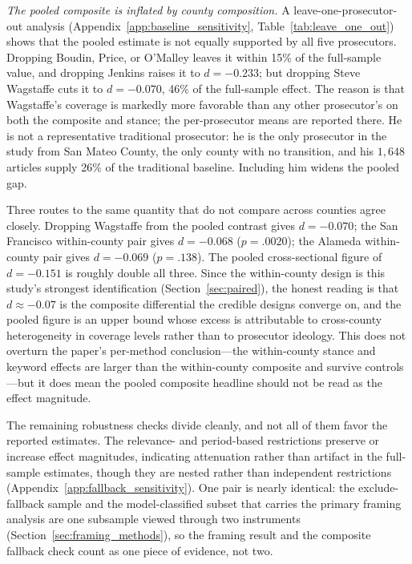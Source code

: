 \documentclass[12pt, letterpaper]{article}
\begin{document}
\emph{The pooled composite is inflated by county composition.} A leave-one-prosecutor-out analysis (Appendix~\ref{app:baseline_sensitivity}, Table~\ref{tab:leave_one_out}) shows that the pooled estimate is not equally supported by all five prosecutors. Dropping Boudin, Price, or O'Malley leaves it within 15\% of the full-sample value, and dropping Jenkins raises it to $d = -0.233$; but dropping Steve Wagstaffe cuts it to $d = -0.070$, 46\% of the full-sample effect. The reason is that Wagstaffe's coverage is markedly more favorable than any other prosecutor's on both the composite and stance; the per-prosecutor means are reported there. He is not a representative traditional prosecutor: he is the only prosecutor in the study from San Mateo County, the only county with no transition, and his $1{,}648$ articles supply 26\% of the traditional baseline. Including him widens the pooled gap.

Three routes to the same quantity that do not compare across counties agree closely. Dropping Wagstaffe from the pooled contrast gives $d = -0.070$; the San Francisco within-county pair gives $d = -0.068$ ($p = .0020$); the Alameda within-county pair gives $d = -0.069$ ($p = .138$). The pooled cross-sectional figure of $d = -0.151$ is roughly double all three. Since the within-county design is this study's strongest identification (Section~\ref{sec:paired}), the honest reading is that $d \approx -0.07$ is the composite differential the credible designs converge on, and the pooled figure is an upper bound whose excess is attributable to cross-county heterogeneity in coverage levels rather than to prosecutor ideology. This does not overturn the paper's per-method conclusion---the within-county stance and keyword effects are larger than the within-county composite and survive controls---but it does mean the pooled composite headline should not be read as the effect magnitude.

The remaining robustness checks divide cleanly, and not all of them favor the reported estimates. The relevance- and period-based restrictions preserve or increase effect magnitudes, indicating attenuation rather than artifact in the full-sample estimates, though they are nested rather than independent restrictions (Appendix~\ref{app:fallback_sensitivity}). One pair is nearly identical: the exclude-fallback sample and the model-classified subset that carries the primary framing analysis are one subsample viewed through two instruments (Section~\ref{sec:framing_methods}), so the framing result and the composite fallback check count as one piece of evidence, not two.
\end{document}
